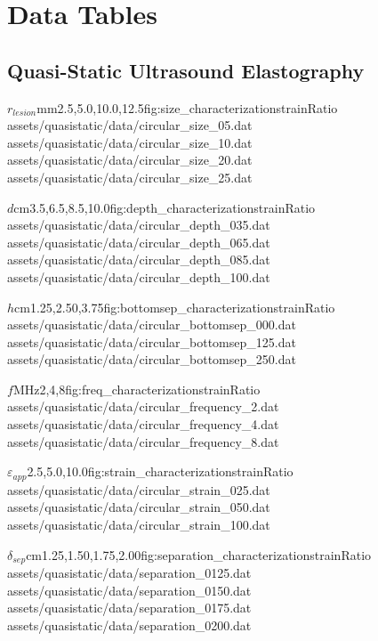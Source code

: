 \chapter{Data Tables}
\label{app:data_tables}
	\renewcommand{\arraystretch}{0.5}

	\section{Quasi-Static Ultrasound Elastography}
	\label{appsec:dt_quasi}
		\begin{multicols}{2}
			\characterizationDataTable%
				{$r_{lesion}$}{mm}{2.5,5.0,10.0,12.5}{fig:size_characterization}{strainRatio}%
				{assets/quasistatic/data/circular_size_05.dat}%
				{assets/quasistatic/data/circular_size_10.dat}%
				{assets/quasistatic/data/circular_size_20.dat}%
				{assets/quasistatic/data/circular_size_25.dat}

			\characterizationDataTable%
				{$d$}{cm}{3.5,6.5,8.5,10.0}{fig:depth_characterization}{strainRatio}%
				{assets/quasistatic/data/circular_depth_035.dat}%
				{assets/quasistatic/data/circular_depth_065.dat}%
				{assets/quasistatic/data/circular_depth_085.dat}%
				{assets/quasistatic/data/circular_depth_100.dat}

			\characterizationDataTable%
				{$h$}{cm}{1.25,2.50,3.75}{fig:bottomsep_characterization}{strainRatio}%
				{assets/quasistatic/data/circular_bottomsep_000.dat}%
				{assets/quasistatic/data/circular_bottomsep_125.dat}%
				{assets/quasistatic/data/circular_bottomsep_250.dat}%
				{}

			\characterizationDataTable%
				{$f$}{MHz}{2,4,8}{fig:freq_characterization}{strainRatio}%
				{assets/quasistatic/data/circular_frequency_2.dat}%
				{assets/quasistatic/data/circular_frequency_4.dat}%
				{assets/quasistatic/data/circular_frequency_8.dat}%
				{}

			\characterizationDataTable%
				{$\varepsilon_{app}$}{\percent}{2.5,5.0,10.0}{fig:strain_characterization}{strainRatio}%
				{assets/quasistatic/data/circular_strain_025.dat}%
				{assets/quasistatic/data/circular_strain_050.dat}%
				{assets/quasistatic/data/circular_strain_100.dat}%
				{}

			\characterizationDataTable%
				{$\delta_{sep}$}{cm}{1.25,1.50,1.75,2.00}{fig:separation_characterization}{strainRatio}%
				{assets/quasistatic/data/separation_0125.dat}%
				{assets/quasistatic/data/separation_0150.dat}%
				{assets/quasistatic/data/separation_0175.dat}%
				{assets/quasistatic/data/separation_0200.dat}


\end{multicols}
